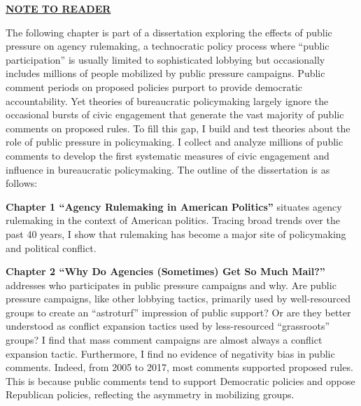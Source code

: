 \documentclass[
      12pt,
        ]{article}
\begin{document}







  \newpage

\noindent 
 
   
    \onehalfspacing 
   
   
\thispagestyle{empty}

\singlespacing

\centerline{\textbf{\underline{NOTE TO READER}}}

The following chapter is part of a dissertation exploring the effects of public pressure on agency rulemaking, a technocratic policy process where ``public participation'' is usually limited to sophisticated lobbying but occasionally includes millions of people mobilized by public pressure campaigns. Public comment periods on proposed policies purport to provide democratic accountability. Yet theories of bureaucratic policymaking largely ignore the occasional bursts of civic engagement that generate the vast majority of public comments on proposed rules. To fill this gap, I build and test theories about the role of public pressure in policymaking. I collect and analyze millions of public comments to develop the first systematic measures of civic engagement and influence in bureaucratic policymaking. The outline of the dissertation is as follows:

\textbf{Chapter 1 ``Agency Rulemaking in American Politics''} situates agency rulemaking in the context of American politics. Tracing broad trends over the past 40 years, I show that rulemaking has become a major site of policymaking and political conflict.

\textbf{Chapter 2 ``Why Do Agencies (Sometimes) Get So Much Mail?''} addresses who participates in public pressure campaigns and why. Are public pressure campaigns, like other lobbying tactics, primarily used by well-resourced groups to create an ``astroturf'' impression of public support? Or are they better understood as conflict expansion tactics used by less-resourced ``grassroots'' groups? I find that mass comment campaigns are almost always a conflict expansion tactic. Furthermore, I find no evidence of negativity bias in public comments. Indeed, from 2005 to 2017, most comments supported proposed rules. This is because public comments tend to support Democratic policies and oppose Republican policies, reflecting the asymmetry in mobilizing groups.
\end{document}
